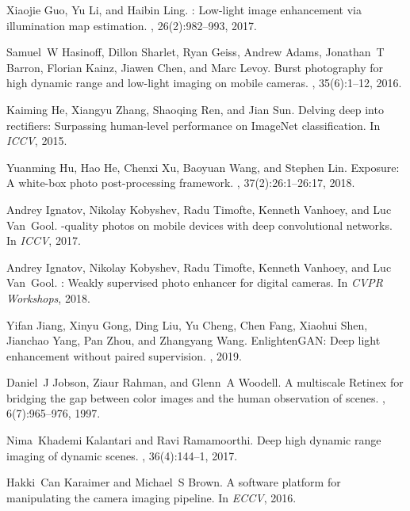 \documentclass[final]{cvpr}
\begin{document}
{\begin{thebibliography}{10}
Xiaojie Guo, Yu Li, and Haibin Ling.
: {L}ow-light image enhancement via illumination map
  estimation.
, 26(2):982--993, 2017.

Samuel~W Hasinoff, Dillon Sharlet, Ryan Geiss, Andrew Adams, Jonathan~T Barron,
  Florian Kainz, Jiawen Chen, and Marc Levoy.
\newblock Burst photography for high dynamic range and low-light imaging on
  mobile cameras.
, 35(6):1--12, 2016.

Kaiming He, Xiangyu Zhang, Shaoqing Ren, and Jian Sun.
\newblock Delving deep into rectifiers: {S}urpassing human-level performance on
  {I}mage{N}et classification.
\newblock In {\em ICCV}, 2015.

Yuanming Hu, Hao He, Chenxi Xu, Baoyuan Wang, and Stephen Lin.
\newblock Exposure: {A} white-box photo post-processing framework.
, 37(2):26:1--26:17, 2018.

Andrey Ignatov, Nikolay Kobyshev, Radu Timofte, Kenneth Vanhoey, and Luc
  Van~Gool.
-quality photos on mobile devices with deep convolutional
  networks.
\newblock In {\em ICCV}, 2017.

Andrey Ignatov, Nikolay Kobyshev, Radu Timofte, Kenneth Vanhoey, and Luc
  Van~Gool.
: {W}eakly supervised photo enhancer for digital
  cameras.
\newblock In {\em CVPR Workshops}, 2018.

Yifan Jiang, Xinyu Gong, Ding Liu, Yu Cheng, Chen Fang, Xiaohui Shen, Jianchao
  Yang, Pan Zhou, and Zhangyang Wang.
\newblock Enlighten{G}{A}{N}: {D}eep light enhancement without paired
  supervision.
, 2019.

Daniel~J Jobson, Ziaur Rahman, and Glenn~A Woodell.
\newblock A multiscale {R}etinex for bridging the gap between color images and
  the human observation of scenes.
, 6(7):965--976, 1997.

Nima~Khademi Kalantari and Ravi Ramamoorthi.
\newblock Deep high dynamic range imaging of dynamic scenes.
, 36(4):144--1, 2017.

Hakki~Can Karaimer and Michael~S Brown.
\newblock A software platform for manipulating the camera imaging pipeline.
\newblock In {\em ECCV}, 2016.


\end{thebibliography}}
\end{document}
